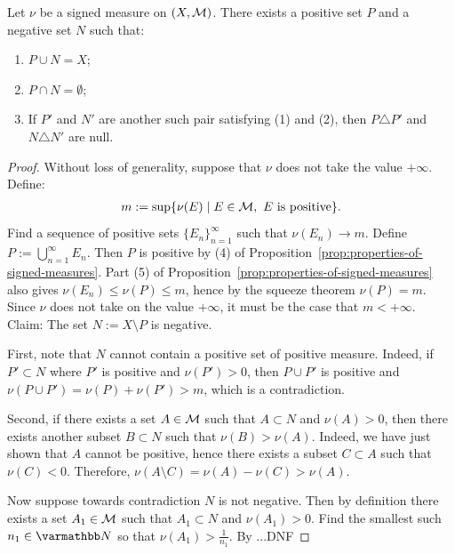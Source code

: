 \begin{theorem}\label{thm:hdt}
    Let $\nu$ be a signed measure on $(X,\mathcal{M})$. There exists a positive set $P$ and a negative set $N$ such that:
    \begin{enumerate}[label = (\arabic*),itemsep=1pt,topsep=3pt]
        \item $P \cup N = X$;
        \item $P \cap N = \emptyset$;
        \item If $P'$ and $N'$ are another such pair satisfying (1) and (2), then $P \triangle P'$ and $N \triangle N'$ are null. 
    \end{enumerate}
\end{theorem}
    \begin{proof}
        Without loss of generality, suppose that $\nu$ does not take the value $+\infty$. Define:
            \begin{equation*}
            \begin{split}
                m:= \sup \{\nu(E) \mid E \in \mathcal{M}, \text{ $E$ is positive}\}.
            \end{split}
            \end{equation*}
        Find a sequence of positive sets $\{E_n\}_{n = 1}^\infty$ such that $\nu(E_n) \rightarrow m$. Define $P := \bigcup_{n = 1}^\infty E_n$. Then $P$ is positive by (4) of Proposition~\ref{prop:properties-of-signed-measures}. Part (5) of Proposition~\ref{prop:properties-of-signed-measures} also gives $\nu(E_n) \leq \nu(P) \leq m$, hence by the squeeze theorem $\nu(P) = m$. Since $\nu$ does not take on the value $+\infty$, it must be the case that $m <+\infty$. Claim: The set $N:=X \setminus P$ is negative. 
        
        First, note that $N$ cannot contain a positive set of positive measure. Indeed, if $P' \subset N$ where $P'$ is positive and $\nu(P') > 0$, then $P \cup P'$ is positive and $\nu(P \cup P') = \nu(P) + \nu(P') > m$, which is a contradiction. 
        
        Second, if there exists a set $A \in \mathcal{M}$ such that $A \subset N$ and $\nu(A) > 0$, then there exists another subset $B \subset N$ such that $\nu(B) > \nu(A)$. Indeed, we have just shown that $A$ cannot be positive, hence there exists a subset $C \subset A$ such that $\nu(C) < 0$. Therefore, $\nu(A \setminus C) = \nu(A) - \nu(C) > \nu(A)$.

        Now suppose towards contradiction $N$ is not negative. Then by definition there exists a set $A_1 \in \mathcal{M}$ such that $A_1 \subset N$ and $\nu(A_1) > 0$. Find the smallest such $n_1 \in \bfN$ so that $\nu(A_1) > \frac{1}{n_1}$. By {\color{red}...DNF}


\end{proof}
